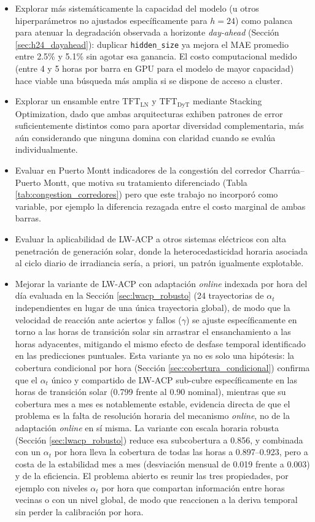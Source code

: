 \begin{itemize}
    \item Explorar más sistemáticamente la capacidad del modelo (u otros hiperparámetros no ajustados específicamente para $h=24$) como palanca para atenuar la degradación observada a horizonte \textit{day-ahead} (Sección \ref{sec:h24_dayahead}): duplicar \texttt{hidden\_size} ya mejora el MAE promedio entre 2.5\% y 5.1\% sin agotar esa ganancia. El costo computacional medido (entre 4 y 5 horas por barra en GPU para el modelo de mayor capacidad) hace viable una búsqueda más amplia si se dispone de acceso a cluster.
    \item Explorar un ensamble entre $\text{TFT}_\text{LN}$ y $\text{TFT}_\text{DyT}$ mediante Stacking Optimization, dado que ambas arquitecturas exhiben patrones de error suficientemente distintos como para aportar diversidad complementaria, más aún considerando que ninguna domina con claridad cuando se evalúa individualmente.
    \item Evaluar en Puerto Montt indicadores de la congestión del corredor Charrúa--Puerto Montt, que motiva su tratamiento diferenciado (Tabla \ref{tab:congestion_corredores}) pero que este trabajo no incorporó como variable, por ejemplo la diferencia rezagada entre el costo marginal de ambas barras.
    \item Evaluar la aplicabilidad de LW-ACP a otros sistemas eléctricos con alta penetración de generación solar, donde la heterocedasticidad horaria asociada al ciclo diario de irradiancia sería, a priori, un patrón igualmente explotable.
    \item Mejorar la variante de LW-ACP con adaptación \textit{online} indexada por hora del día evaluada en la Sección \ref{sec:lwacp_robusto} (24 trayectorias de $\alpha_t$ independientes en lugar de una única trayectoria global), de modo que la velocidad de reacción ante aciertos y fallos ($\gamma$) se ajuste específicamente en torno a las horas de transición solar sin arrastrar el ensanchamiento a las horas adyacentes, mitigando el mismo efecto de desfase temporal identificado en las predicciones puntuales. Esta variante ya no es solo una hipótesis: la cobertura condicional por hora (Sección \ref{sec:cobertura_condicional}) confirma que el $\alpha_t$ único y compartido de LW-ACP sub-cubre específicamente en las horas de transición solar (0.799 frente al 0.90 nominal), mientras que su cobertura mes a mes es notablemente estable, evidencia directa de que el problema es la falta de resolución horaria del mecanismo \textit{online}, no de la adaptación \textit{online} en sí misma. La variante con escala horaria robusta (Sección \ref{sec:lwacp_robusto}) reduce esa subcobertura a 0.856, y combinada con un $\alpha_t$ por hora lleva la cobertura de todas las horas a 0.897--0.923, pero a costa de la estabilidad mes a mes (desviación mensual de 0.019 frente a 0.003) y de la eficiencia. El problema abierto es reunir las tres propiedades, por ejemplo con niveles $\alpha_t$ por hora que compartan información entre horas vecinas o con un nivel global, de modo que reaccionen a la deriva temporal sin perder la calibración por hora.

\end{itemize}
